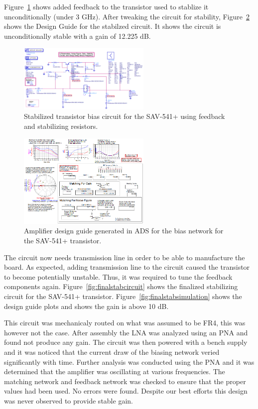 \documentclass[conference]{IEEEtran}
\begin{document}
Figure~\ref{fig:designcuidecircuitstabilized} shows added feedback to the transistor used to stablize it unconditionally (under 3 GHz).  After tweaking the circuit for stability, Figure~\ref{fig:designcuidesimulationstabilized} shows the Design Guide for the stabilzed circuit. It shows the circuit is unconditionally stable with a gain of 12.225 dB.

\begin{figure}[!h]
\centering
\includegraphics[width=2.5in]{pics/DesignGuideStablizedCircuit.png}
\caption{Stabilized transistor bias circuit for the SAV-541+ using feedback and stabilizing resistors.}
\label{fig:designcuidecircuitstabilized}
\end{figure}

\begin{figure}[!h]
\centering
\includegraphics[width=2.5in]{pics/DesignGuideStablizedSimulation.png}
\caption{Amplifier design guide generated in ADS for the bias network for the SAV-541+ transistor.}
\label{fig:designcuidesimulationstabilized}
\end{figure}

The circuit now needs transmission line in order to be able to manufacture the board.  As expected, adding transmission line to the circuit caused the transistor to become potentially unstable.  Thus, it was required to tune the feedback components again.  Figure~\ref{fig:finalstabcircuit} shows the finalized stabilizing circuit for the SAV-541+ transistor.  Figure~\ref{fig:finalstabsimulation} shows the design guide plots and shows the gain is above 10 dB.

This circuit was mechanicaly routed on what was assumed to be FR4, this was however not the case. After assembly the LNA was analyzed using an PNA and found not produce any gain. The circuit was then powered with a bench supply and it was noticed that the current draw of the biasing network veried significantly with time. Further analysis was conducted using the PNA and it was determined that the amplifier was oscillating at various frequencies. The matching network and feedback network was checked to ensure that the proper values had been used. No errors were found. Despite our best efforts this design was never observed to provide stable gain.
\end{document}
